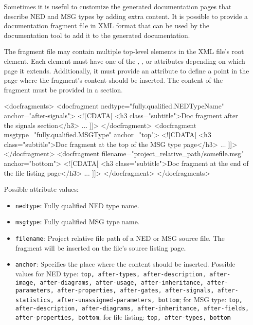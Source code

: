 Sometimes it is useful to customize the generated documentation pages that describe
NED and MSG types by adding extra content. It is possible to provide a documentation
fragment file in XML format that can be used by the documentation tool to add it to
the generated documentation. 

The fragment file may contain multiple top-level  
elements in the XML file's root element. Each  element must
have one of the , , or  attributes
depending on which page it extends. Additionally, it must provide an
 attribute to define a point in the page where the fragment's
content should be inserted. The content of the fragment must be provided in
a \ttt{<![CDATA[]]>} section.

\begin{xml}
<docfragments>
    <docfragment nedtype="fully.qualified.NEDTypeName" anchor="after-signals">
    <![CDATA[
        <h3 class="subtitle">Doc fragment after the signals section</h3>
        ...
    ]]>
    </docfragment>
    <docfragment msgtype="fully.qualified.MSGType" anchor="top">
    <![CDATA[
        <h3 class="subtitle">Doc fragment at the top of the MSG type page</h3>
        ...
    ]]>
    </docfragment>
    <docfragment filename="project_relative_path/somefile.msg" anchor="bottom">
    <![CDATA[
        <h3 class="subtitle">Doc fragment at the end of the file listing page</h3>
        ...
    ]]>
    </docfragment>
</docfragments>
\end{xml}
    
Possible attribute values:
\begin{itemize}
    \item \texttt{nedtype}: Fully qualified NED type name. 
    \item \texttt{msgtype}: Fully qualified MSG type name.
    \item \texttt{filename}: Project relative file path of a NED or MSG source file. 
    The fragment will be inserted on the file's source listing page.
    \item \texttt{anchor}: Specifies the place where the content should be inserted.
    Possible values for NED type: \texttt{top, after-types, after-description,
    after-image, after-diagrams, after-usage, after-inheritance, after-parameters,
    after-properties, after-gates, after-signals, after-statistics, 
    after-unassigned-parameters, bottom}; for MSG type: \texttt{top, after-description,
    after-diagrams, after-inheritance, after-fields, after-properties, bottom};
    for file listing: \texttt{top, after-types, bottom}
\end{itemize}        

